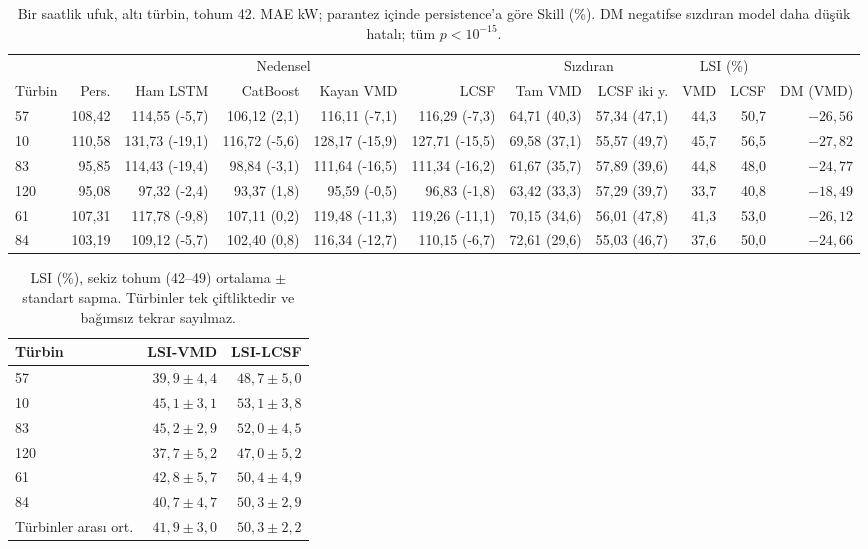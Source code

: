 \documentclass[11pt,a4paper]{article}
\begin{document}
\begin{table}[htbp]\centering
\caption{Bir saatlik ufuk, altı türbin, tohum 42. MAE kW; parantez içinde
persistence'a göre Skill (\%). DM negatifse sızdıran model daha düşük hatalı;
tüm $p<10^{-15}$.}
\scriptsize
\begin{tabular}{lrrrrrrrrrr}
\toprule
& \multicolumn{5}{c}{Nedensel} & \multicolumn{2}{c}{Sızdıran} &
\multicolumn{2}{c}{LSI (\%)} & \\
\cmidrule(lr){2-6}\cmidrule(lr){7-8}\cmidrule(lr){9-10}
Türbin & Pers. & Ham LSTM & CatBoost & Kayan VMD & LCSF &
Tam VMD & LCSF iki y. & VMD & LCSF & DM (VMD) \\
\midrule
57  & 108,42 & 114,55 (-5,7)  & 106,12 (2,1)  & 116,11 (-7,1)  & 116,29 (-7,3)  & 64,71 (40,3) & 57,34 (47,1) & 44,3 & 50,7 & $-26,56$ \\
10  & 110,58 & 131,73 (-19,1) & 116,72 (-5,6) & 128,17 (-15,9) & 127,71 (-15,5) & 69,58 (37,1) & 55,57 (49,7) & 45,7 & 56,5 & $-27,82$ \\
83  &  95,85 & 114,43 (-19,4) &  98,84 (-3,1) & 111,64 (-16,5) & 111,34 (-16,2) & 61,67 (35,7) & 57,89 (39,6) & 44,8 & 48,0 & $-24,77$ \\
120 &  95,08 &  97,32 (-2,4)  &  93,37 (1,8)  &  95,59 (-0,5)  &  96,83 (-1,8)  & 63,42 (33,3) & 57,29 (39,7) & 33,7 & 40,8 & $-18,49$ \\
61  & 107,31 & 117,78 (-9,8)  & 107,11 (0,2)  & 119,48 (-11,3) & 119,26 (-11,1) & 70,15 (34,6) & 56,01 (47,8) & 41,3 & 53,0 & $-26,12$ \\
84  & 103,19 & 109,12 (-5,7)  & 102,40 (0,8)  & 116,34 (-12,7) & 110,15 (-6,7)  & 72,61 (29,6) & 55,03 (46,7) & 37,6 & 50,0 & $-24,66$ \\
\bottomrule
\end{tabular}
\end{table}

\begin{table}[htbp]\centering
\caption{LSI (\%), sekiz tohum (42--49) ortalama $\pm$ standart sapma.
Türbinler tek çiftliktedir ve bağımsız tekrar sayılmaz.}
\footnotesize
\begin{tabular}{lrr}
\toprule
Türbin & LSI-VMD & LSI-LCSF \\
\midrule
57  & $39,9\pm4,4$ & $48,7\pm5,0$ \\
10  & $45,1\pm3,1$ & $53,1\pm3,8$ \\
83  & $45,2\pm2,9$ & $52,0\pm4,5$ \\
120 & $37,7\pm5,2$ & $47,0\pm5,2$ \\
61  & $42,8\pm5,7$ & $50,4\pm4,9$ \\
84  & $40,7\pm4,7$ & $50,3\pm2,9$ \\
\midrule
Türbinler arası ort. & $41,9\pm3,0$ & $50,3\pm2,2$ \\
\bottomrule
\end{tabular}
\end{table}
\end{document}
